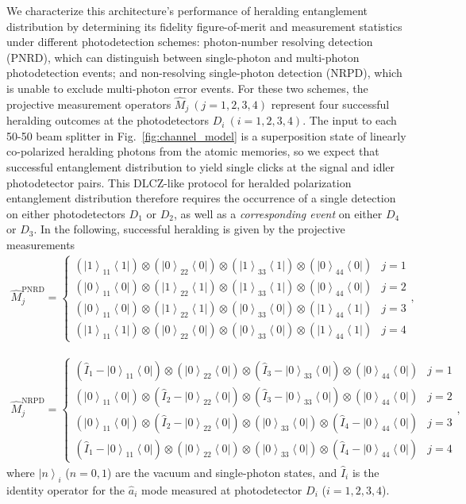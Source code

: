 \documentclass[aps,twocolumn,secnumarabic,amsmath,amssymb,pra,groupedaddress,
showpacs, showkeys]{revtex4-1}
\newcommand{\bra}[1]{\left\langle #1 \right|}
\newcommand{\ket}[1]{\left|#1\right\rangle}
\newcommand{\pna}[1]{\left(#1\right)}
\begin{document}
We characterize this architecture's performance of heralding entanglement
distribution by determining its fidelity figure-of-merit and measurement
statistics under different photodetection schemes: photon-number resolving
detection (PNRD), which can distinguish between single-photon and multi-photon
photodetection events; and non-resolving single-photon detection (NRPD), which
is unable to exclude multi-photon error events. For these two schemes, the
projective measurement operators $\hat{M}_j~\pna{j=1,2,3,4}$ represent four
successful heralding outcomes at the photodetectors $D_i~\pna{i=1,2,3,4}$. The
input to each 50-50 beam splitter in Fig.~\ref{fig:channel_model} is a
superposition state of linearly co-polarized heralding photons from the atomic
memories, so we expect that successful entanglement distribution to yield
single clicks at the signal and idler photodetector pairs. This DLCZ-like
protocol for heralded polarization entanglement distribution therefore requires
the occurrence of a single detection on either photodetectors $D_1$ or $D_2$,
as well as a \emph{corresponding event} on either $D_4$ or $D_3$. In the
following, successful heralding is given by the projective measurements
\begin{align}
    \hat{M}_j^{\textrm{PNRD}} = \left\{
	\begin{array}{lr}
\pna{\ket{1}_{11}\bra{1}}\otimes\pna{\ket{0}_{22}\bra{0}}\otimes\pna{\ket{1}_{33}\bra{1}}\otimes\pna{\ket{0}_{44}\bra{0}} & j=1\\
\pna{\ket{0}_{11}\bra{0}}\otimes\pna{\ket{1}_{22}\bra{1}}\otimes\pna{\ket{1}_{33}\bra{1}}\otimes\pna{\ket{0}_{44}\bra{0}} & j=2\\
\pna{\ket{0}_{11}\bra{0}}\otimes\pna{\ket{1}_{22}\bra{1}}\otimes\pna{\ket{0}_{33}\bra{0}}\otimes\pna{\ket{1}_{44}\bra{1}} & j=3\\
\pna{\ket{1}_{11}\bra{1}}\otimes\pna{\ket{0}_{22}\bra{0}}\otimes\pna{\ket{0}_{33}\bra{0}}\otimes\pna{\ket{1}_{44}\bra{1}} & j=4
	\end{array}
	\right.,
\end{align}

\begin{align}
    \hat{M}_j^{\textrm{NRPD}} = \left\{
	\begin{array}{lr}
\pna{\hat{I}_1-\ket{0}_{11}\bra{0}}\otimes\pna{\ket{0}_{22}\bra{0}}\otimes\pna{\hat{I}_3-\ket{0}_{33}\bra{0}}\otimes\pna{\ket{0}_{44}\bra{0}} & j=1\\
\pna{\ket{0}_{11}\bra{0}}\otimes\pna{\hat{I}_2-\ket{0}_{22}\bra{0}}\otimes\pna{\hat{I}_3-\ket{0}_{33}\bra{0}}\otimes\pna{\ket{0}_{44}\bra{0}} & j=2\\
\pna{\ket{0}_{11}\bra{0}}\otimes\pna{\hat{I}_2-\ket{0}_{22}\bra{0}}\otimes\pna{\ket{0}_{33}\bra{0}}\otimes\pna{\hat{I}_4-\ket{0}_{44}\bra{0}} & j=3\\
\pna{\hat{I}_1-\ket{0}_{11}\bra{0}}\otimes\pna{\ket{0}_{22}\bra{0}}\otimes\pna{\ket{0}_{33}\bra{0}}\otimes\pna{\hat{I}_4-\ket{0}_{44}\bra{0}} & j=4
	\end{array}
	\right.,
	\label{eq:chap3:meas_povm}
\end{align}
where $\ket{n}_i$ ($n=0,1$) are the vacuum and single-photon states, and
$\hat{I}_i$ is the identity operator for the $\hat{a}_i$ mode measured at
photodetector $D_i$ ($i=1,2,3,4$).
\end{document}
